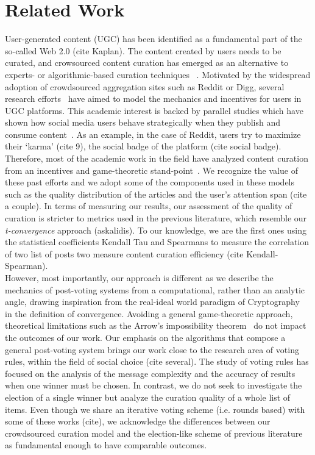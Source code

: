 \section{Related Work}
  User-generated content (UGC) has been identified as a fundamental part of the so-called Web 2.0 (cite Kaplan). The content created by users needs to be curated, and crowsourced content curation has emerged as an alternative to experts- or algorithmic-based curation techniques~\cite{askalidis2013theoretical} . Motivated by the widespread adoption of crowdsourced aggregation sites such as Reddit or Digg, several research efforts~\cite{askalidis2013theoretical,ghosh2011incentivizing} have aimed to model the mechanics and incentives for users in UGC platforms. This academic interest is backed by parallel studies which have shown how
social media users behave strategically when they publish and consume content~\cite{may2014filter}. As an example, in the case of Reddit, users try to maximize their `karma' (cite 9), the social badge of the platform (cite social badge). 
   Therefore, most of the academic work in the field have analyzed content curation from an incentives and game-theoretic stand-point~\cite{ghosh2011incentivizing,das2010ranking,gupte2009news,may2014filter}. We recognize the value of these past efforts and we adopt some of the components used in these models such as the quality distribution of the articles and the user's attention span (cite a couple). In terms of measuring our results, our assessment of the quality of curation is stricter to metrics used in the previous literature, which resemble our \textit{t-convergence} approach (askalidis). To our knowledge, we are the first ones using the statistical coefficients Kendall Tau and Spearmans to measure the correlation of two list of posts two measure content curation efficiency (cite Kendall-Spearman). \\
   
    However, most importantly, our approach is different as we describe the mechanics of post-voting systems from a computational, rather than an analytic angle, drawing inspiration from the real-ideal world paradigm of Cryptography~\cite{lindell} in the definition of convergence. Avoiding a general game-theoretic approach, theoretical limitations such as the Arrow's impossibility theorem~\cite{arrow1950difficulty} do not impact the outcomes of our work.
    Our emphasis on the algorithms that compose a general post-voting system brings our work close to the research area of voting rules, within the field of social choice (cite several). The study of voting rules has focused on the analysis of the message complexity and the accuracy of results when one winner must be chosen. In contrast, we do not seek to investigate the election of a single winner but analyze the curation quality of a whole list of items. Even though we share an iterative voting scheme (i.e. rounds based) with some of these works (cite), we acknowledge the differences between our crowdsourced curation model and the election-like scheme of previous literature as fundamental enough to have comparable outcomes. \\

